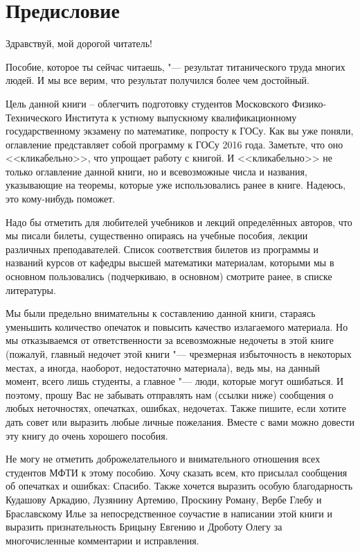 \chapter{Предисловие}

\begin{center} 
	Здравствуй, мой дорогой читатель!
\end{center}

Пособие, которое ты сейчас читаешь, "--- результат титанического труда многих людей. И мы все верим, что результат получился более чем достойный. 

Цель данной книги – облегчить подготовку студентов Московского Физико-Технического Института к устному выпускному квалификационному государственному экзамену по математике, попросту к ГОСу. Как вы уже поняли, оглавление представляет собой программу к ГОСу 2016 года. Заметьте, что оно <<кликабельно>>, что упрощает работу с книгой. И <<кликабельно>> не только оглавление данной книги, но и всевозможные числа и названия, указывающие на теоремы, которые уже использовались ранее в книге. Надеюсь, это кому-нибудь поможет. 

Надо бы отметить для любителей учебников и лекций определённых авторов, что мы писали билеты, существенно опираясь на учебные пособия, лекции различных преподавателей. Список соответствия билетов из программы и названий курсов от кафедры высшей математики материалам, которыми мы в основном пользовались (подчеркиваю, в основном) смотрите ранее, в списке литературы.

Мы были предельно внимательны к составлению данной книги, стараясь уменьшить количество опечаток и повысить качество излагаемого материала. Но мы отказываемся от ответственности за всевозможные недочеты в этой книге (пожалуй, главный недочет этой книги "--- чрезмерная избыточность в некоторых местах, а иногда, наоборот, недостаточно материала), ведь мы, на данный момент, всего лишь студенты, а главное "--- люди, которые могут ошибаться. И поэтому, прошу Вас не забывать отправлять нам (ссылки ниже) сообщения о любых неточностях, опечатках, ошибках, недочетах. Также пишите, если хотите дать совет или выразить любые личные пожелания. Вместе с вами можно довести эту книгу до очень хорошего пособия.

Не могу не отметить доброжелательного и внимательного отношения всех студентов МФТИ к этому пособию. Хочу сказать всем, кто присылал сообщения об опечатках и ошибках: \glqq Спасибо\grqq. Также хочется выразить особую благодарность Кудашову Аркадию, Лузянину Артемию, Проскину Роману, Вербе Глебу и Браславскому Илье за непосредственное соучастие в написании этой книги и выразить признательность Брицыну Евгению и Дроботу Олегу за многочисленные комментарии и исправления.

